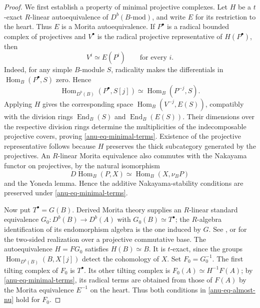 \documentclass[12pt,a4paper,english,reqno]{amsart}
\numberwithin{equation}{section}
\theoremstyle{plain}
\theoremstyle{definition}
\begin{document}
\begin{proof}
We first establish a property of minimal projective complexes.  Let $H$
be a $t$-exact $R$-linear autoequivalence of $D^b(B\text{-}\mathrm{mod})$,
and write $E$ for its restriction to the heart.  Thus $E$ is a Morita
autoequivalence.  If $P^\bullet$ is a radical bounded complex of
projectives and $V^\bullet$ is the radical projective representative
of $H(P^\bullet)$, then
\begin{equation}\label{anu-eq-minimal-terms}
 V^i\simeq E(P^i)\qquad\text{for every }i.
\end{equation}
Indeed, for any simple $B$-module $S$, radicality makes the
differentials in $\operatorname{Hom}_B(P^\bullet,S)$ zero.  Hence
\[
 \operatorname{Hom}_{D^b(B)}(P^\bullet,S[j])
 \simeq \operatorname{Hom}_B(P^{-j},S).
\]
Applying $H$ gives the corresponding space
$\operatorname{Hom}_B(V^{-j},E(S))$, compatibly with the division
rings $\operatorname{End}_B(S)$ and $\operatorname{End}_B(E(S))$.
Their dimensions over the respective division rings determine the
multiplicities of the indecomposable projective covers, proving \eqref{anu-eq-minimal-terms}.  Existence of the projective
representative follows because $H$ preserves the thick subcategory
generated by the projectives.  An $R$-linear Morita equivalence also commutes with the Nakayama
functor on projectives, by the natural isomorphism
\[
 D\operatorname{Hom}_B(P,X)
 \simeq \operatorname{Hom}_B(X,\nu_B P)
\]
and the Yoneda lemma.  Hence the additive Nakayama-stability
conditions are preserved under \eqref{anu-eq-minimal-terms}.

Now put $T^\bullet=G(B)$.  Derived Morita theory supplies an $R$-linear
standard equivalence $G_0:D^b(B)\longrightarrow D^b(A)$ with
$G_0(B)\simeq T^\bullet$; the $R$-algebra identification of its
endomorphism algebra is the one induced by $G$.  See
\cite[Corollary~3.5]{anu-Rickard1991}, or
\cite[Section~2.2]{RouquierZimmermann2003} for the
two-sided realization over a projective commutative base.
The autoequivalence $H=FG_0$ satisfies $H(B)\simeq B$.
It is $t$-exact, since the groups
$\operatorname{Hom}_{D^b(B)}(B,X[j])$ detect the cohomology of $X$.
Set $F_0=G_0^{-1}$.  The first tilting complex of $F_0$ is
$T^\bullet$.  Its other tilting complex is
$F_0(A)\simeq H^{-1}F(A)$; by
\eqref{anu-eq-minimal-terms}, its radical terms are obtained from
those of $F(A)$ by the Morita equivalence $E^{-1}$ on the heart.
Thus both conditions in \eqref{anu-eq-almost-nu} hold for $F_0$.
\end{proof}
\end{document}
